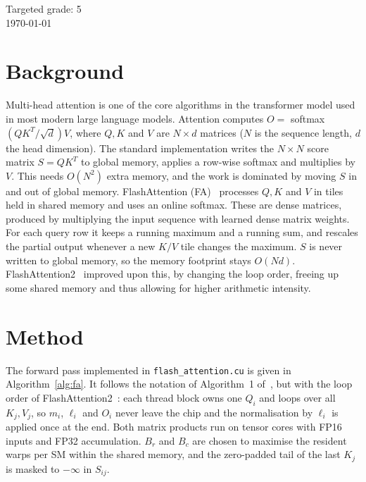 \documentclass[12pt]{article}
\begin{document}
\begin{titlepage}

{\large Targeted grade: 5}\\[1cm]

{\large \today}\\[2cm] %

\vfill %

\end{titlepage}

\section{Background}
Multi-head attention is one of the core algorithms in the transformer model used in most modern large language models. Attention computes $O =$ softmax$(QK^T / \sqrt{d}) V$, where $Q, K$ and $V$ are $N \times d$ matrices ($N$ is the sequence length, $d$ the head dimension). The standard implementation writes the $N \times N$ score matrix $S = QK^T$ to global memory, applies a row-wise softmax and multiplies by $V$. This needs $O(N^2)$ extra memory, and the work is dominated by moving $S$ in and out of global memory. FlashAttention (FA)~\cite{dao2022flashattention} processes $Q, K$ and $V$ in tiles held in shared memory and uses an online softmax. These are dense matrices, produced by multiplying the input sequence with learned dense matrix weights. For each query row it keeps a running maximum and a running sum, and rescales the partial output whenever a new $K/V$ tile changes the maximum. $S$ is never written to global memory, so the memory footprint stays $O(Nd)$. FlashAttention2~\cite{dao2024flashattention2} improved upon this, by changing the loop order, freeing up some shared memory and thus allowing for higher arithmetic intensity.



\section{Method}


The forward pass implemented in \texttt{flash\_attention.cu} is given in Algorithm~\ref{alg:fa}. It follows the notation of Algorithm~1 of~\cite{dao2022flashattention}, but with the loop order of FlashAttention2~\cite{dao2024flashattention2}: each thread block owns one $Q_i$ and loops over all $K_j, V_j$, so $m_i$, $\ell_i$ and $O_i$ never leave the chip and the normalisation by $\ell_i$ is applied once at the end. Both matrix products run on tensor cores with FP16 inputs and FP32 accumulation. $B_r$ and $B_c$ are chosen to maximise the resident warps per SM within the shared memory, and the zero-padded tail of the last $K_j$ is masked to $-\infty$ in $S_{ij}$.
\end{document}
